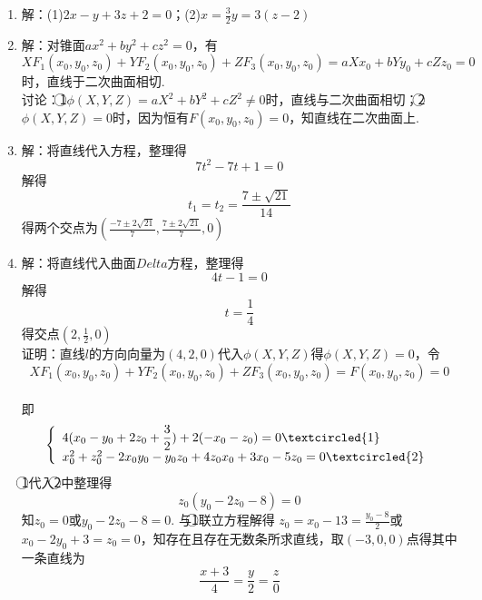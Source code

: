 \documentclass[UTF8]{ctexart}
\begin{document}
\begin{enumerate}
\item 解：(1)$2x-y+3z+2=0$；(2)$x=\displaystyle\frac{3}{2}y=3(z-2)$

\item 解：对锥面$ax^2+by^2+cz^2=0$，有
$$XF_1(x_0,y_0,z_0)+YF_2(x_0,y_0,z_0)+ZF_3(x_0,y_0,z_0)=aXx_0+bYy_0+cZz_0=0$$时，直线于二次曲面相切. \\
讨论：\textcircled{1}$\phi(X,Y,Z)=aX^2+bY^2+cZ^2\neq0$时，直线与二次曲面相切；\textcircled{2}$\phi(X,Y,Z)=0$时，因为恒有$F(x_0,y_0,z_0)=0$，知直线在二次曲面上. 

\item 解：将直线代入方程，整理得$$7t^2-7t+1=0$$解得$$t_1=t_2=\frac{7\pm\sqrt{21}}{14}$$得两个交点为$\left(\displaystyle\frac{-7\pm2\sqrt{21}}{7},\displaystyle\frac{7\pm2\sqrt{21}}{7},0\right)$

\item 解：将直线代入曲面$Delta$方程，整理得$$4t-1=0$$解得$$t=\frac{1}{4}$$得交点$(2,\displaystyle\frac{1}{2},0)$\\
证明：直线$l$的方向向量为$(4,2,0)$代入$\phi(X,Y,Z)$得$\phi(X,Y,Z)=0$，令
$$XF_1(x_0,y_0,z_0)+YF_2(x_0,y_0,z_0)+ZF_3(x_0,y_0,z_0)=F(x_0,y_0,z_0)=0$$\\
即$$\left\{\begin{array}{l}4(x_0-y_0+2z_0+\displaystyle\frac{3}{2})+2(-x_0-z_0)=0\textcircled{1}\\x_0^2+z_0^2-2x_0y_0-y_0z_0+4z_0x_0+3x_0-5z_0=0\textcircled{2}\end{array}\right.$$
\textcircled{1}代入\textcircled{2}中整理得
$$z_0(y_0-2z_0-8)=0$$知$z_0=0$或$y_0-2z_0-8=0$.
与\textcircled{1}联立方程解得
$z_0=x_0-13=\displaystyle\frac{y_0-8}{2}$或$x_0-2y_0+3=z_0=0$，知存在且存在无数条所求直线，取$(-3,0,0)$点得其中一条直线为$$\displaystyle\frac{x+3}{4}=\displaystyle\frac{y}{2}=\displaystyle\frac{z}{0}$$
\end{enumerate}
\end{document}
